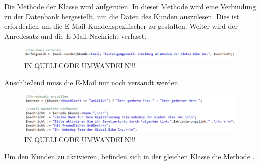 Die Methode \grqq{} der Klasse \grqq{} wird aufgerufen. In dieser Methode wird eine Verbindung zu der Datenbank hergestellt, um die Daten des Kunden auszulesen.  Dies ist erforderlich um die E-Mail Kundenspezifischer zu gestalten.
Weiter wird der Anredesatz und die E-Mail-Nachricht verfasst.

\begin{figure}[H]
\begin{center}
\includegraphics[width=12cm]{Bilder/Michael_Quellcode2.png}
\end{center}
\caption{IN QUELLCODE UMWANDELN!!!}
\end{figure}

Anschließend muss die E-Mail nur noch versandt werden.

\begin{figure}[H]
\begin{center}
\includegraphics[width=12cm]{Bilder/Michael_Quellcode3.png}
\end{center}
\caption{IN QUELLCODE UMWANDELN!!!}
\end{figure}

Um den Kunden zu aktivieren, befinden sich in der gleichen Klasse die Methode \grqq{}. 